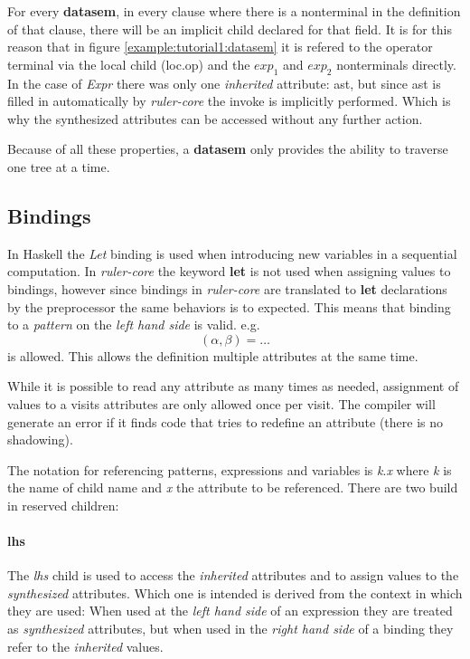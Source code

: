 \documentclass[twoside, titlepage, openright, a4paper]{book}
\newcommand{\rcore}{\emph{ruler-core }}
\begin{document}
For every \textbf{datasem}, in every clause where there is a nonterminal in the definition of that clause, there will be an implicit child declared for that field. It is for this reason that in figure \ref{example:tutorial1:datasem} it is refered to the operator terminal via the local child (loc.op) and the \emph{\ensuremath{exp_1}} and \emph{\ensuremath{exp_2}} nonterminals directly. In the case of \emph{Expr} there was only one \emph{inherited} attribute: ast, but since ast is filled in automatically by \rcore the invoke is implicitly performed. Which is why the synthesized attributes can be accessed without any further action. 

Because of all these properties, a \textbf{datasem} only provides the ability to traverse one tree at a time.
\subsection{Bindings}
\label{bindings}
In Haskell the \emph{Let} binding is used when introducing new variables in a sequential computation. In \rcore the keyword \textbf{let} is not used when assigning values to bindings, however since bindings in \rcore are translated to \textbf{let} declarations by the preprocessor the same behaviors is to expected. This means that binding to a \emph{pattern} on the \emph{left hand side} is valid. e.g. \[ (\alpha, \beta) = \ldots \] is allowed. This allows the definition multiple attributes at the same time.

While it is possible to read any attribute as many times as needed, assignment of values to a visits attributes are only allowed once per visit. The compiler will generate an error if it finds code that tries to redefine an attribute (there is no shadowing).

The notation for referencing patterns, expressions and variables is \emph{k}.\emph{x} where \emph{k} is the name of child name and \emph{x} the attribute to be referenced. There are two build in reserved children:

\paragraph{lhs}
The \emph{lhs} child is used to access the \emph{inherited} attributes and to assign values to the \emph{synthesized} attributes. Which one is intended is derived from the context in which they are used: When used at the \emph{left hand side} of an expression they are treated as \emph{synthesized} attributes, but when used in the \emph{right hand side} of a binding they refer to the \emph{inherited} values.
 
\end{document}
